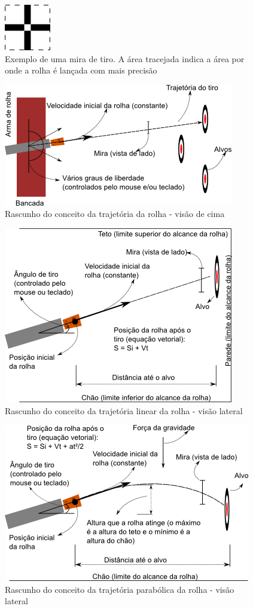 \documentclass[a4paper,10pt]{article}
\begin{document}
\begin{figure}[htbp]
 \centering
  \includegraphics{mira.png}
 \caption{Exemplo de uma mira de tiro. A \'area tracejada indica a \'area por onde a rolha \'e lan\c cada com mais precis\~ao}
 \label{fig:mira}
\end{figure}


\begin{figure}[htbp]
 \centering
  \includegraphics{tiro_cima.png}
 \caption{Rascunho do conceito da trajet\'oria da rolha - vis\~ao de cima}
 \label{fig:tiro_cima}
\end{figure}


\begin{figure}[htbp]
 \centering
  \includegraphics{movimento_linear.png}
 \caption{Rascunho do conceito da trajet\'oria linear da rolha - vis\~ao lateral}
 \label{fig:movimento_linear}
\end{figure}


\begin{figure}[htbp]
 \centering
  \includegraphics{movimento_parabolico.png}
 \caption{Rascunho do conceito da trajet\'oria parab\'olica da rolha - vis\~ao lateral}
 \label{fig:movimento_parabolico}
\end{figure}
\end{document}
